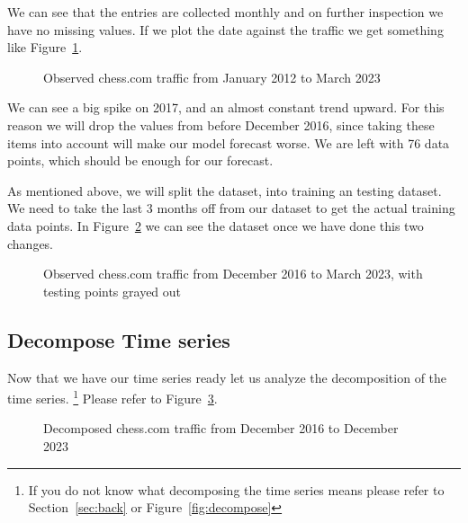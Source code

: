 \documentclass[journal]{IEEEtran}
\begin{document}
We can see that the entries are collected monthly and on further inspection we
have no missing values. If we plot the date against the traffic we get
something like Figure~\ref{fig:obs}.

\begin{figure}[htbp]
  \centering
  
    \caption{Observed chess.com traffic from January 2012 to March 2023}
  \label{fig:obs}
\end{figure}

We can see a big spike on 2017, and an almost constant trend upward. For this
reason we will drop the values from before December 2016, since taking these
items into account will make our model forecast worse. We are left with 76
data points, which should be enough for our forecast.

As mentioned above, we will split the dataset, into training an testing
dataset. We need to take the last 3 months off from our dataset to get the
actual training data points. In Figure~\ref{fig:obs-2} we can see the dataset
once we have done this two changes.

\begin{figure}[htbp]
  \centering
  
    \caption{Observed chess.com traffic from December 2016 to March 2023, with
        testing points grayed out}
    \label{fig:obs-2}
\end{figure}

\subsection{Decompose Time series}\label{sub:decompose-time-series}

Now that we have our time series ready let us analyze the decomposition of the
time series. \footnote{If you do not know what decomposing the time series
means please refer to Section~\ref{sec:back} or Figure~\ref{fig:decompose}}
Please refer to Figure~\ref{fig:decom-chess}.

\begin{figure}[htbp]
  \centering
  
    \caption{Decomposed chess.com traffic from December 2016 to December 2023}
    \label{fig:decom-chess}
\end{figure}
\end{document}
